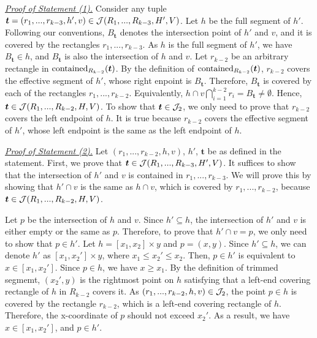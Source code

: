 \noindent \underline{\em Proof of Statement (1).} Consider any tuple $\textrm{\boldmath${t}$} = (r_1,...,r_{k-3}, h', v) \in \mathcal{J}(R_1,...,R_{k-3},H',V)$. Let $h$ be the full segment of $h'$. Following our conventions, $B_\bm{t}$ denotes the intersection point of $h'$ and $v$, and it is covered by the rectangles $r_1,...,r_{k-3}$. As $h$ is the full segment of $h'$, we have $B_\bm{t} \in h$, and $B_\bm{t}$ is also the intersection of $h$ and $v$. Let $r_{k-2}$ be an arbitrary rectangle in $\mathrm{contained}_{R_{k-2}}(\textrm{\boldmath${t}$})$. By the definition of $\mathrm{contained}_{R_{k-2}}(\textrm{\boldmath${t}$})$, $r_{k-2}$ covers the effective segment of $h'$, whose right enpoint is $B_{\bm{t}}$. Therefore, $B_{\bm{t}}$ is covered by each of the rectangles $r_1,...,r_{k-2}$. Equivalently, $h \cap v \bigcap_{i = 1}^{k-2} r_i = B_\bm{t} \neq \emptyset$. Hence,
$\textrm{\boldmath${t}$} \in \mathcal{J}(R_1,...,R_{k-2},H,V)$. To show that $\textrm{\boldmath${t}$} \in \mathcal{J}_2$, we only need to prove that $r_{k-2}$ covers the left endpoint of $h$. It is true because $r_{k-2}$ covers the effective segment of $h'$, whose left endpoint is the same as the left endpoint of $h$. 

\vgap 

\noindent \underline{\em Proof of Statement (2).} Let $(r_1,...,r_{k-2},h,v)$, $h'$, $\bm{t}$ be as defined in the statement. First, we prove that $\textrm{\boldmath${t}$}\in \mathcal{J}(R_1,...,R_{k-3}, H', V)$. It suffices to show that the intersection of $h'$ and $v$ is contained in $r_1,...,r_{k-3}$. We will prove this by showing that $h'\cap v$ is the same as $h\cap v$, which is covered by $r_1,...,r_{k-2}$, because $\textrm{\boldmath${t}$} \in \mathcal{J}(R_1,...,R_{k-2},H,V)$.

\vgap 

Let $p$ be the intersection of $h$ and $v$. Since $h' \subseteq h$, the intersection of $h'$ and $v$ is either empty or the same as $p$.
Therefore, to prove that $h' \cap v = p$, we only need to show that $p \in h'$. Let $h = [x_1,x_2]\times y$ and $p = (x,y)$. Since $h' \subseteq h$, we can denote $h'$ as $[x_1, x_2'] \times y$, where $x_1 \le x_2' \le x_2$. Then, $p \in h'$ is equivalent to $x \in [x_1, x_2']$. Since $p \in h$, we have $x \ge x_1$. By the definition of trimmed segmemt, $(x_2',y)$ is the rightmost point on $h$ satisfying that a left-end covering rectangle of $h$ in $R_{k-2}$ covers it. As $(r_1,...,r_{k-2},h,v) \in \mathcal{J}_2$, the point $p \in h$ is covered by the rectangle $r_{k-2}$, which is a left-end covering rectangle of $h$. Therefore, the x-coordinate of $p$ should not exceed $x_2'$. As a result, we have $x \in [x_1, x_2']$, and $p \in h'$.

